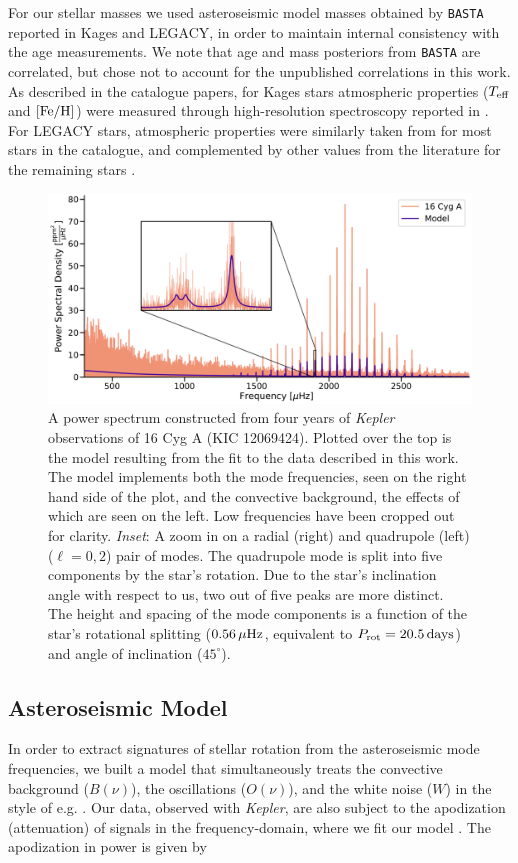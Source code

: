 \documentclass[12pt]{article}
\newcommand{\teff}{\mbox{$T_{\rm eff}$}\xspace}
\newcommand{\feh}{\mbox{$\rm{[Fe/H]}$}\xspace}
\newcommand{\kepler}{\emph{Kepler}\xspace}
\begin{document}
For our stellar masses we used asteroseismic model masses obtained by \texttt{BASTA} reported in Kages and LEGACY, in order to maintain internal consistency with the age measurements. We note that age and mass posteriors from \texttt{BASTA} are correlated, but chose not to account for the unpublished correlations in this work.
As described in the catalogue papers, for Kages stars atmospheric properties (\teff and \feh) were measured through high-resolution spectroscopy reported in \cite{huber+2013a}. For LEGACY stars, atmospheric properties were similarly taken from \cite{buchhave+latham2015} for most stars in the catalogue, and complemented by other values from the literature for the remaining stars \cite[see Table 3]{silvaaguirre+2017}.

\begin{figure}
	\centering
	\includegraphics[width=.99\textwidth]{Images/modelfit.pdf}
	\caption{A power spectrum constructed from four years of \kepler observations of 16 Cyg A (KIC 12069424). Plotted over the top is the model resulting from the fit to the data described in this work. The model implements both the mode frequencies, seen on the right hand side of the plot, and the convective background, the effects of which are seen on the left. Low frequencies have been cropped out for clarity. \textit{Inset}: A zoom in on a radial (right) and quadrupole (left) ($\ell = 0, 2$) pair of modes. The quadrupole mode is split into five components by the star's rotation. Due to the star's inclination angle with respect to us, two out of five peaks are more distinct. The height and spacing of the mode components is a function of the star's rotational splitting ($0.56\, \mu\rm{Hz}$, equivalent to $P_{\rm rot} = 20.5\, \rm{days}$) and angle of inclination ($45^\circ$).}
	\label{fig:modelfit}
\end{figure}

\subsection{Asteroseismic Model}\label{s:seismo}
In order to extract signatures of stellar rotation from the asteroseismic mode frequencies, we built a model that simultaneously treats the convective background ($B(\nu)$), the oscillations ($O(\nu)$), and the white noise ($W$) in the style of e.g. \cite{davies+2015}. Our data, observed with \kepler, are also subject to the apodization (attenuation) of signals in the frequency-domain, where we fit our model \cite{chaplin+2011}. The apodization in power is given by
\end{document}
